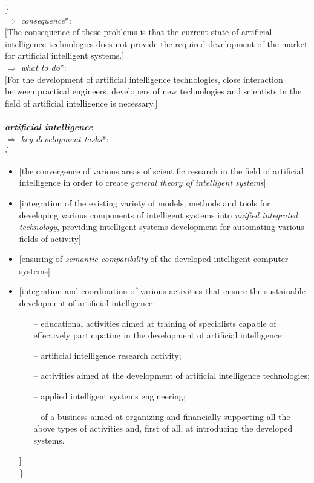 \documentclass[10pt, a4paper]{proc}
\begin{document}
 \}\\
 \(\Rightarrow\) \textit{consequence}*:\\
 \([\)The consequence of these problems is that the current state of artificial intelligence technologies does not provide the required development of the market for artificial intelligent systems.]\\
 \(\Rightarrow\) \textit{what to do}*:\\
 \([\)For the development of artificial intelligence technologies, close interaction between practical engineers, developers of new technologies and scientists in the field of artificial intelligence is necessary.]\\~\\
 \noindent\textbf{\textit{artificial intelligence}}\\
 \(\Rightarrow\) \textit{key development tasks}*:\\
 \{
 \begin{itemize}
  \item \([\)the convergence of various areas of scientific research in the field of artificial intelligence in order to create \textit{general theory of intelligent systems}]
  \item \([\)integration of the existing variety of models, methods and tools for developing various components of intelligent systems into \textit{unified integrated technology}, providing intelligent systems development for automating various fields of activity]
  \item \([\)ensuring of \textit{semantic compatibility} of the developed intelligent computer systems]
  \item \([\)integration and coordination of various activities that ensure the sustainable development of artificial intelligence:
  \begin{enumerate}
   \item[--] educational activities aimed at training of specialists capable of effectively participating in the development of artificial intelligence;
   \item[--] artificial intelligence research activity;
   \item[--] activities aimed at the development of artificial intelligence technologies;
   \item[--] applied intelligent systems engineering;
   \item[--] of a business aimed at organizing and financially supporting all the above types of activities and, first of all, at introducing the developed systems.
  \end{enumerate}
  \quad]\\
  \}
 \end{itemize}
\end{document}

